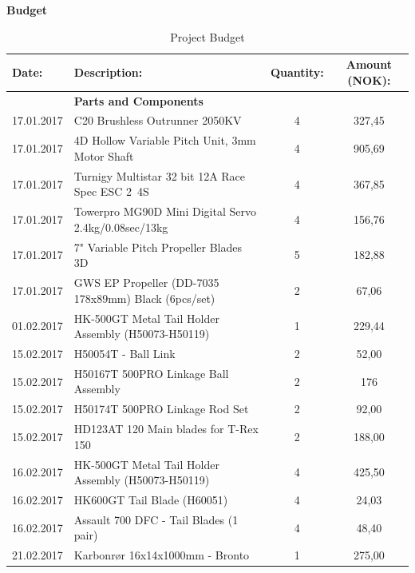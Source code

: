 \begin{table}[H]
\begin{center}
\textbf{\Large Budget}
\end{center}
\caption{Project Budget }
\label{tab:budget}
\begin{tabular}{|l|l|c|c|}
\rowcolor{cadetgrey}
\centering \textbf{Date:}    &\textbf{Description:} 	 &\textbf{Quantity:} & \textbf{Amount (NOK): } \\ %
\hline
\rowcolor{gainsboro} & \textbf{Parts and Components} & & \\ 
                        17.01.2017 & C20 Brushless Outrunner 2050KV  & 4  & 327,45 \\ 
\rowcolor{gainsboro}    17.01.2017 & 4D Hollow Variable Pitch Unit, 3mm Motor Shaft & 4 & 905,69 \\
                        17.01.2017 & Turnigy Multistar 32 bit 12A Race Spec ESC 2~4S & 4 & 367,85 \\
\rowcolor{gainsboro}    17.01.2017 & Towerpro MG90D Mini Digital Servo 2.4kg/0.08sec/13kg & 4  & 156,76   \\
                        17.01.2017 & 7" Variable Pitch Propeller Blades 3D  & 5  & 182,88 \\
\rowcolor{gainsboro}    17.01.2017 & GWS EP Propeller (DD-7035 178x89mm) Black (6pcs/set)  & 2  & 67,06   \\
                        01.02.2017 & HK-500GT Metal Tail Holder Assembly (H50073-H50119)  & 1  & 229,44 \\
\rowcolor{gainsboro}    15.02.2017 & H50054T - Ball Link  & 2  & 52,00   \\
                        15.02.2017 & H50167T 500PRO Linkage Ball Assembly  & 2  & 176 \\
\rowcolor{gainsboro}    15.02.2017 & H50174T 500PRO Linkage Rod Set  & 2  & 92,00  \\
                        15.02.2017 & HD123AT 120 Main blades for T-Rex 150  & 2  & 188,00 \\
\rowcolor{gainsboro}    16.02.2017 & HK-500GT Metal Tail Holder Assembly (H50073-H50119)   & 4 & 425,50   \\
                        16.02.2017 & HK600GT Tail Blade (H60051)  & 4  & 24,03 \\
\rowcolor{gainsboro}    16.02.2017 & Assault 700 DFC - Tail Blades (1 pair)  & 4  & 48,40   \\
                        21.02.2017 & Karbonrør 16x14x1000mm - Bronto   & 1  & 275,00 \\

\end{tabular}
\end{table}
